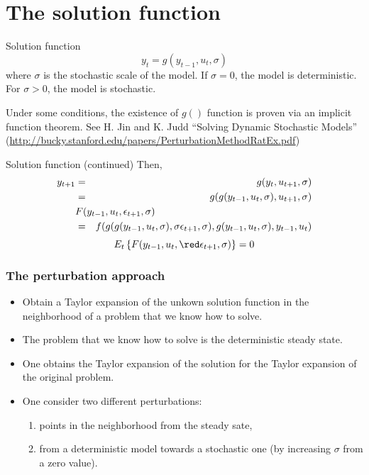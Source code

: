 \documentclass{beamer}
\begin{document}
\section[The solution function]{The solution function}
\begin{slide}{Solution function}
\[
y_t = g(y_{t-1},u_t,\sigma)
\]
where $\sigma$ is the stochastic scale of the model. If $\sigma = 0$, the model is deterministic. For $\sigma > 0$, the model is stochastic.

Under some conditions, the existence of $g()$ function is proven via an implicit function theorem. See H. Jin and K. Judd ``Solving Dynamic Stochastic Models'' {\tiny (\url{http://bucky.stanford.edu/papers/PerturbationMethodRatEx.pdf})}
\end{slide}

\begin{slide}{Solution function (continued)}
Then,
{
\begin{eqnarray*}
  y_{t+1} &=& g(y_t,u_{t+1},\sigma)\\
  &=& g(g(y_{t-1},u_t,\sigma),u_{t+1},\sigma)\\
\lefteqn{F(y_{t-1},u_t,\epsilon_{t+1},\sigma)}\\
 &=& f(g(g(y_{t-1},u_t,\sigma),\sigma\epsilon_{t+1},\sigma),g(y_{t-1},u_t,\sigma),y_{t-1},u_t)
\end{eqnarray*}
}
\[
  E_t\left\{F(y_{t-1},u_t,{\red \epsilon_{t+1}},\sigma)\right\} = 0
\]
  
\end{slide}

\begin{frame} \frametitle{The perturbation approach}
  \begin{itemize}
  \item Obtain a Taylor expansion of the unkown solution function in the neighborhood of a problem that we know how to solve.
  \item The problem that we know how to solve is the deterministic steady state.
  \item One obtains the Taylor expansion of the solution for the Taylor expansion of the original problem.
  \item One consider two different perturbations:
    \begin{enumerate}
    \item points in the neighborhood from the steady sate,
    \item from a deterministic model towards a stochastic one (by increasing $\sigma$ from a zero value).
    \end{enumerate}
  \end{itemize}
\end{frame}
\end{document}
